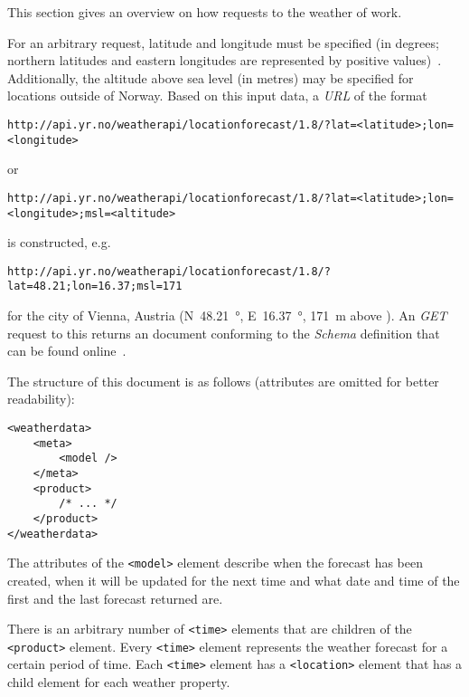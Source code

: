 This section gives an overview on how requests to the weather  of \yrno work.

For an arbitrary request, latitude and longitude must be specified (in degrees; northern latitudes and eastern longitudes are represented by positive values)~\cite{yrno_documentation}. Additionally, the altitude above sea level (in metres) may be specified for locations outside of Norway. Based on this input data, a \emph{URL} of the format

\begin{lstlisting}
http://api.yr.no/weatherapi/locationforecast/1.8/?lat=<latitude>;lon=<longitude>
\end{lstlisting}

or

\begin{lstlisting}
http://api.yr.no/weatherapi/locationforecast/1.8/?lat=<latitude>;lon=<longitude>;msl=<altitude>
\end{lstlisting}

is constructed, e.g.

\begin{lstlisting}
http://api.yr.no/weatherapi/locationforecast/1.8/?lat=48.21;lon=16.37;msl=171
\end{lstlisting}

for the city of Vienna, Austria (N~\SI {48.21}{\degree }, E~\SI {16.37}{\degree }, \SI {171}{\metre } above ). An  \emph{GET} request to this  returns an  document conforming to the  \emph{Schema}\cite{xml-schema} definition that can be found online~\cite{yrno_schema}.

The structure of this  document is as follows (attributes are omitted for better readability):

\begin{lstlisting}
<weatherdata>
	<meta>
		<model />
	</meta>
	<product>
		/* ... */
	</product>
</weatherdata>
\end{lstlisting}

The attributes of the \texttt{<model>} element describe when the forecast has been created, when it will be updated for the next time and what date and time of the first and the last forecast returned are.

There is an arbitrary number of \texttt{<time>} elements that are children of the \texttt{<product>} element. Every \texttt{<time>} element represents the weather forecast for a certain period of time. Each \texttt{<time>} element has a \texttt{<location>} element that has a child element for each weather property.

